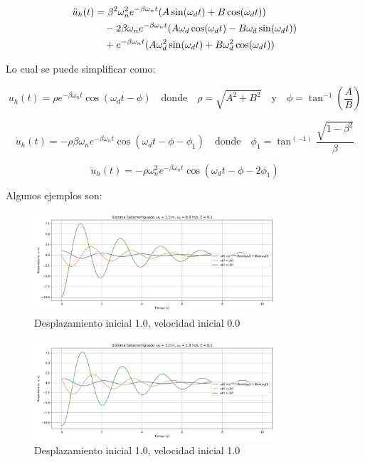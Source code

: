\documentclass{article}  %
\begin{document}
\begin{align}
    \ddot{u}_h(t) &= \beta^2 \omega_n^2 e^{-\beta \omega_n t} (A \sin(\omega_d t) + B \cos(\omega_d t)) \notag \\
    &\quad - 2\beta \omega_n e^{-\beta \omega_n t} (A \omega_d \cos(\omega_d t) - B \omega_d \sin(\omega_d t)) \notag \\
    &\quad + e^{-\beta \omega_n t} (A \omega_d^2 \sin(\omega_d t) + B \omega_d^2 \cos(\omega_d t))
\end{align}
    
Lo cual se puede simplificar como:

\begin{equation}
    u_h(t) = \rho e^{-\beta \omega_n t} \cos(\omega_d t - \phi) \quad \text{donde} \quad \rho = \sqrt{A^2 + B^2} \quad \text{y} \quad \phi = \tan^{-1}(\frac{A}{B})
\end{equation}

\begin{equation}
    \dot{u}_h(t) = -\rho \beta \omega_n e^{-\beta \omega_n t} \cos(\omega_d t - \phi -\phi_1) \quad \text{donde} \quad \phi_1 = \tan^(-1)\frac{\sqrt{1-\beta^2}}{\beta}
\end{equation}

\begin{equation}
    \ddot{u}_h(t) = -\rho \omega_n^2 e^{-\beta \omega_n t} \cos(\omega_d t - \phi - 2\phi_1)
\end{equation}

Algunos ejemplos son:

\begin{figure}[H]
    \centering
    \includegraphics[width=0.8\textwidth]{GRAFICOS/sis_subamortiguado_u0_1.0_v0_0.0_zeta_0.1.png}
    \caption{Desplazamiento inicial 1.0, velocidad inicial 0.0}
    \label{fig:ejemplo1}
\end{figure}

\begin{figure}[H]
    \centering
    \includegraphics[width=0.8\textwidth]{GRAFICOS/sis_subamortiguado_u0_1.0_v0_1.0_zeta_0.1.png}
    \caption{Desplazamiento inicial 1.0, velocidad inicial 1.0}
    \label{fig:ejemplo1}
\end{figure}
\end{document}
